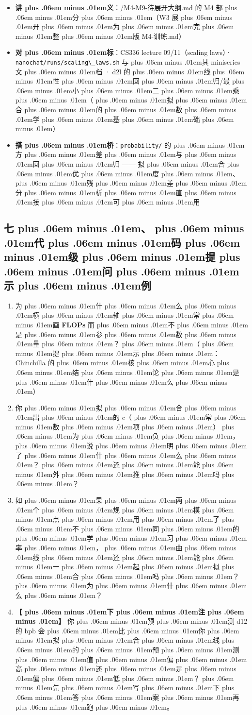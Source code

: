 \documentclass[
]{article}
\newcommand{\passthrough}[1]{#1}
\providecommand{\tightlist}{%
  \setlength{\itemsep}{0pt}\setlength{\parskip}{0pt}}
\def\zh#1{{\zhfont #1}}
\def\sym#1{{\symfont #1}}
\def\codezh#1{{\zhmonofont #1}}
\def\zhglue{\hskip0pt plus .06em minus .01em}
\begin{document}
\begin{itemize}
\tightlist
\item
  \textbf{\zh{讲\zhglue 义}}\zh{：}\passthrough{\codezh{{\zh{讲}}{\zh{义}}/M4-M9-{\zh{待}}{\zh{展}}{\zh{开}}{\zh{大}}{\zh{纲}}.md}} \zh{的} M4 \zh{部\zhglue 分\zhglue （}W3 \zh{展\zhglue 开\zhglue 为\zhglue 完\zhglue 整\zhglue 版} \passthrough{\codezh{M4-{\zh{训}}{\zh{练}}.md}}\zh{）}
\item
  \textbf{\zh{对\zhglue 标}}\zh{：}CS336 lecture 09/11\zh{（}scaling laws\zh{）}\sym{·} \passthrough{\lstinline!nanochat/runs/scaling\_laws.sh!} \zh{与\zhglue 其} miniseries \zh{文\zhglue 档} \sym{·} d2l \zh{的\zhglue 线\zhglue 性\zhglue 回\zhglue 归}/\zh{最\zhglue 小\zhglue 二\zhglue 乘\zhglue （\zhglue 拟\zhglue 合\zhglue 的\zhglue 数\zhglue 学\zhglue 基\zhglue 础\zhglue ）}
\item
  \textbf{\zh{搭\zhglue 桥}}\zh{：}\passthrough{\lstinline!probability/!} \zh{的\zhglue 方\zhglue 差\zhglue 与\zhglue 回\zhglue 归} ------ \zh{拟\zhglue 合\zhglue 优\zhglue 度\zhglue 、\zhglue 残\zhglue 差\zhglue 分\zhglue 析\zhglue 直\zhglue 接\zhglue 可\zhglue 用}
\end{itemize}

\subsection{\zh{七\zhglue 、\zhglue 代\zhglue 码\zhglue 级\zhglue 提\zhglue 问\zhglue 示\zhglue 例}}\label{ux4e03ux4ee3ux7801ux7ea7ux63d0ux95eeux793aux4f8b}

\begin{enumerate}
\def\labelenumi{\arabic{enumi}.}
\tightlist
\item
  \zh{为\zhglue 什\zhglue 么\zhglue 横\zhglue 轴\zhglue 常\zhglue 画} \textbf{FLOPs} \zh{而\zhglue 不\zhglue 是\zhglue 参\zhglue 数\zhglue 量\zhglue ？\zhglue （\zhglue 提\zhglue 示\zhglue ：}Chinchilla \zh{的\zhglue 核\zhglue 心\zhglue 结\zhglue 论\zhglue 是\zhglue 什\zhglue 么\zhglue ）}
\item
  \zh{你\zhglue 拟\zhglue 合\zhglue 出\zhglue 的} \(c\)\zh{（\zhglue 常\zhglue 数\zhglue 项\zhglue ）\zhglue 为\zhglue 负\zhglue ，\zhglue 说\zhglue 明\zhglue 了\zhglue 什\zhglue 么\zhglue ？\zhglue 还\zhglue 能\zhglue 外\zhglue 推\zhglue 吗\zhglue ？}
\item
  \zh{如\zhglue 果\zhglue 两\zhglue 个\zhglue 规\zhglue 模\zhglue 点\zhglue 用\zhglue 了\zhglue 不\zhglue 同\zhglue 的\zhglue 学\zhglue 习\zhglue 率\zhglue ，\zhglue 曲\zhglue 线\zhglue 还\zhglue 能\zhglue 一\zhglue 起\zhglue 拟\zhglue 合\zhglue 吗\zhglue ？\zhglue 为\zhglue 什\zhglue 么\zhglue ？}
\item
  \textbf{\zh{【\zhglue 下\zhglue 注\zhglue 】}} \zh{你\zhglue 预\zhglue 测} d12 \zh{的} bpb \zh{会\zhglue 比\zhglue 你\zhglue 拟\zhglue 合\zhglue 线\zhglue 的\zhglue 预\zhglue 测\zhglue 值\zhglue 偏\zhglue 高\zhglue 还\zhglue 是\zhglue 偏\zhglue 低\zhglue ？\zhglue 先\zhglue 写\zhglue 下\zhglue 答\zhglue 案\zhglue 再\zhglue 跑\zhglue 。}
\end{enumerate}
\end{document}
